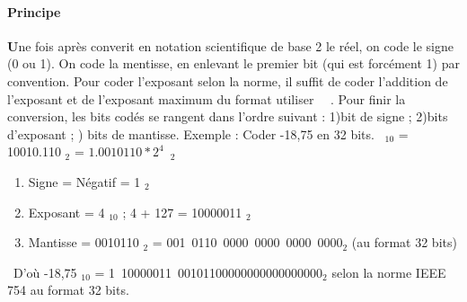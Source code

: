\documentclass{article}
\begin{document}
\paragraph{Principe}\textbf{U}ne fois apr\`es converit en notation scientifique de base 2 le r\'eel, on code le signe (0 ou 1). On code la mentisse, en enlevant le premier bit (qui est forc\'ement 1) par convention. Pour coder l'exposant selon la norme, il suffit de coder l'addition de l'exposant et de l'exposant maximum du format utiliser~\cite{Norme_IEEE754(2)}~\cite{Codage_virgule_fixe} .
\newline Pour finir la conversion, les bits cod\'es se rangent dans l'ordre suivant : 1)bit de signe ; 2)bits d'exposant ;
) bits de mantisse.\newline
\newline Exemple : Coder -18,75 en 32 bits.~\cite{Codage_ieee754} \newline
{} $_{10}$ = 10010.110 $_{2}$ = $1.0010110*2^{4}$~$_{2}$
\begin{enumerate}
\item Signe = N\'egatif = 1 $_{2}$
\item Exposant = 4 $_{10}$ ; 4 + 127 = 10000011 $_{2}$
\item Mantisse = 0010110 $_{2}$ =  001~0110~0000~0000~0000~0000$_{2}$ (au format 32 bits)
\end{enumerate}
~\newline D'o\`u -18,75 $_{10}$ = 1~10000011~00101100000000000000000$_{2}$ selon la norme IEEE 754 au format 32 bits.



\newpage




\newpage
\printindex


\newpage
\listoffigures

\end{document}
